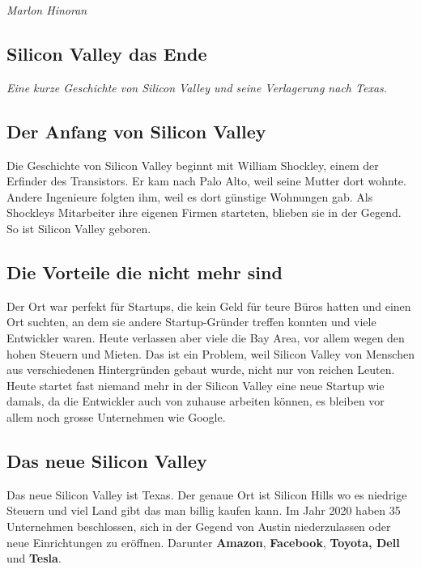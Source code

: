 \documentclass[10pt]{article}
\begin{document}
\vspace{10pt} 
\textit{Marlon Hinoran}

\clearpage


\begin{center}
\section*{Silicon Valley das Ende}
\textit{Eine kurze Geschichte von Silicon Valley und seine Verlagerung nach Texas.}
\end{center}

\subsection*{Der Anfang von Silicon Valley}
Die Geschichte von Silicon Valley beginnt mit William Shockley, einem der Erfinder des Transistors. Er kam nach Palo Alto, weil seine Mutter dort wohnte. Andere Ingenieure folgten ihm, weil es dort günstige Wohnungen gab. Als Shockleys Mitarbeiter ihre eigenen Firmen starteten, blieben sie in der Gegend. So ist Silicon Valley geboren.

\subsection*{Die Vorteile die nicht mehr sind}
Der Ort war perfekt für Startups, die kein Geld für teure Büros hatten und einen Ort suchten, an dem sie andere Startup-Gründer treffen konnten und viele Entwickler waren. Heute verlassen aber viele die Bay Area, vor allem wegen den hohen Steuern und Mieten. Das ist ein Problem, weil Silicon Valley von Menschen aus verschiedenen Hintergründen gebaut wurde, nicht nur von reichen Leuten. Heute startet fast niemand mehr in der Silicon Valley eine neue Startup wie damals, da die Entwickler auch von zuhause arbeiten können, es bleiben vor allem noch grosse Unternehmen wie Google.

\subsection*{Das neue Silicon Valley}
Das neue Silicon Valley ist Texas. Der genaue Ort ist Silicon Hills wo es niedrige Steuern und viel Land gibt das man billig kaufen kann. Im Jahr 2020 haben 35 Unternehmen beschlossen, sich in der Gegend von Austin niederzulassen oder neue Einrichtungen zu eröffnen. Darunter \textbf{Amazon}, \textbf{Facebook}, \textbf{Toyota, Dell} und \textbf{Tesla}.
\end{document}
